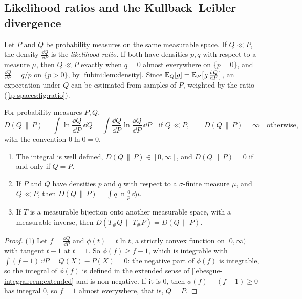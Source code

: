 \begin{notechapter}
\section{Likelihood ratios and the Kullback--Leibler divergence}
\label{lp-spaces:sec:kl}

Let $P$ and $Q$ be probability measures on the same measurable space.
If $Q\ll P$, the density $\frac{\dd Q}{\dd P}$ is the \emph{likelihood
ratio}. If both have densities $p, q$ with respect to a measure $\mu$,
then $Q\ll P$ exactly when $q = 0$ almost everywhere on $\{p = 0\}$,
and $\frac{\dd Q}{\dd P} = q/p$ on $\{p > 0\}$, by
\cref{fubini:lem:density}. Since
$\mathbb{E}_Q[g] = \mathbb{E}_P\bigl[g\,\frac{\mathrm{d} Q}{\mathrm{d} P}\bigr]$, an expectation
under $Q$ can be estimated from samples of $P$, weighted by the ratio
(\cref{lp-spaces:fig:ratio}).

\begin{definition}\label{lp-spaces:def:kl}
For probability measures $P, Q$,
\[
  D(Q\,\|\,P) = \int\ln\frac{\dd Q}{\dd P}\,\dd Q
  = \int\frac{\dd Q}{\dd P}\ln\frac{\dd Q}{\dd P}\,\dd P
  \quad\text{if }Q\ll P , \qquad
  D(Q\,\|\,P) = \infty\quad\text{otherwise,}
\]
with the convention $0\ln0 = 0$.
\end{definition}

\begin{theorem}\label{lp-spaces:thm:kl}
\begin{enumerate}[nosep]
  \item The integral is well defined, $D(Q\,\|\,P)\in[0, \infty]$, and
        $D(Q\,\|\,P) = 0$ if and only if $Q = P$.
  \item If $P$ and $Q$ have densities $p$ and $q$ with respect to a
        $\sigma$-finite measure $\mu$, and $Q\ll P$, then
        $D(Q\,\|\,P) = \int q\ln\frac qp\,\dd\mu$.
  \item If $T$ is a measurable bijection onto another measurable space,
        with a measurable inverse, then
        $D(T_\#Q\,\|\,T_\#P) = D(Q\,\|\,P)$.
\end{enumerate}
\end{theorem}

\begin{proof}
(1) Let $f = \frac{\dd Q}{\dd P}$ and $\phi(t) = t\ln t$, a strictly
convex function on $[0, \infty)$ with tangent $t - 1$ at $t = 1$. So
$\phi(f)\geq f - 1$, which is integrable with
$\int(f - 1)\,\dd P = Q(X) - P(X) = 0$: the negative part of $\phi(f)$
is integrable, so the integral of $\phi(f)$ is defined in the extended
sense of \cref{lebesgue-integral:rem:extended} and is non-negative.
If it is $0$, then $\phi(f) - (f - 1)\geq0$
has integral $0$, so $f = 1$ almost everywhere, that is, $Q = P$.


\end{proof}
\end{notechapter}
